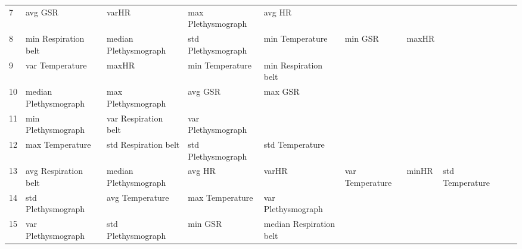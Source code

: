 \begin{landscape}
\begin{table}[]
\begin{tabular}{l|llllllll}
7        & avg GSR                 & varHR                   & max Plethysmograph      & avg HR                  &                         &                       &                         &                         &                         &         \\
8        & min Respiration belt    & median Plethysmograph   & std Plethysmograph      & min Temperature         & min GSR                 & maxHR                 &                         &                         &                         &         \\
9        & var Temperature         & maxHR                   & min Temperature         & min Respiration belt    &                         &                       &                         &                         &                         &         \\
10       & median Plethysmograph   & max Plethysmograph      & avg GSR                 & max GSR                 &                         &                       &                         &                         &                         &         \\
11       & min Plethysmograph      & var Respiration belt    & var Plethysmograph      &                         &                         &                       &                         &                         &                         &         \\
12       & max Temperature         & std Respiration belt    & std Plethysmograph      & std Temperature         &                         &                       &                         &                         &                         &         \\
13       & avg Respiration belt    & median Plethysmograph   & avg HR                  & varHR                   & var Temperature         & minHR                 & std Temperature         &                         &                         &         \\
14       & std Plethysmograph      & avg Temperature         & max Temperature         & var Plethysmograph      &                         &                       &                         &                         &                         &         \\
15       & var Plethysmograph      & std Plethysmograph      & min GSR                 & median Respiration belt &                         &                       &                         &                         &                         &         \\

\end{tabular}
\end{table}
\end{landscape}
